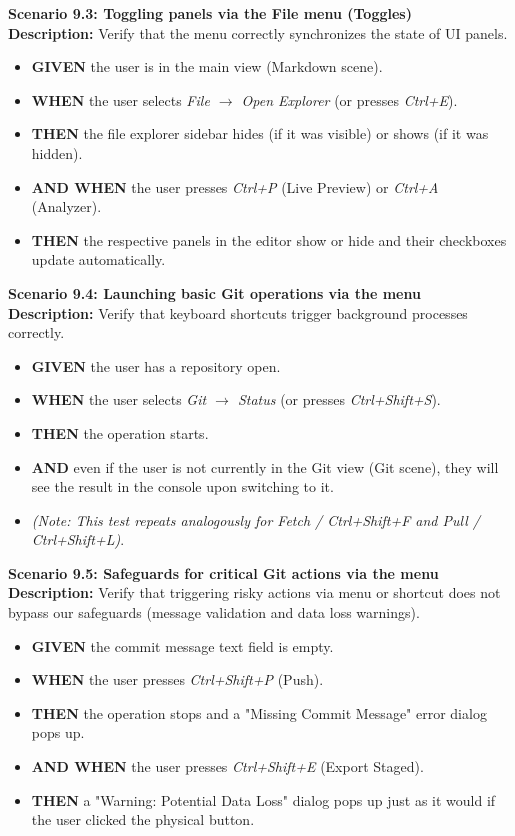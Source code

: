 \documentclass[12pt, a4paper]{article}
\begin{document}
\textbf{Scenario 9.3: Toggling panels via the File menu (Toggles)} \\
\textbf{Description:} Verify that the menu correctly synchronizes the state of UI panels.
\begin{itemize}
    \item \textbf{GIVEN} the user is in the main view (Markdown scene).
    \item \textbf{WHEN} the user selects \textit{File $\rightarrow$ Open Explorer} (or presses \textit{Ctrl+E}).
    \item \textbf{THEN} the file explorer sidebar hides (if it was visible) or shows (if it was hidden).
    \item \textbf{AND WHEN} the user presses \textit{Ctrl+P} (Live Preview) or \textit{Ctrl+A} (Analyzer).
    \item \textbf{THEN} the respective panels in the editor show or hide and their checkboxes update automatically.
\end{itemize}

\textbf{Scenario 9.4: Launching basic Git operations via the menu} \\
\textbf{Description:} Verify that keyboard shortcuts trigger background processes correctly.
\begin{itemize}
    \item \textbf{GIVEN} the user has a repository open.
    \item \textbf{WHEN} the user selects \textit{Git $\rightarrow$ Status} (or presses \textit{Ctrl+Shift+S}).
    \item \textbf{THEN} the operation starts.
    \item \textbf{AND} even if the user is not currently in the Git view (Git scene), they will see the result in the console upon switching to it.
    \item \textit{(Note: This test repeats analogously for Fetch / Ctrl+Shift+F and Pull / Ctrl+Shift+L)}.
\end{itemize}

\textbf{Scenario 9.5: Safeguards for critical Git actions via the menu} \\
\textbf{Description:} Verify that triggering risky actions via menu or shortcut does not bypass our safeguards (message validation and data loss warnings).
\begin{itemize}
    \item \textbf{GIVEN} the commit message text field is empty.
    \item \textbf{WHEN} the user presses \textit{Ctrl+Shift+P} (Push).
    \item \textbf{THEN} the operation stops and a "Missing Commit Message" error dialog pops up.
    \item \textbf{AND WHEN} the user presses \textit{Ctrl+Shift+E} (Export Staged).
    \item \textbf{THEN} a "Warning: Potential Data Loss" dialog pops up just as it would if the user clicked the physical button.
\end{itemize}
\end{document}
